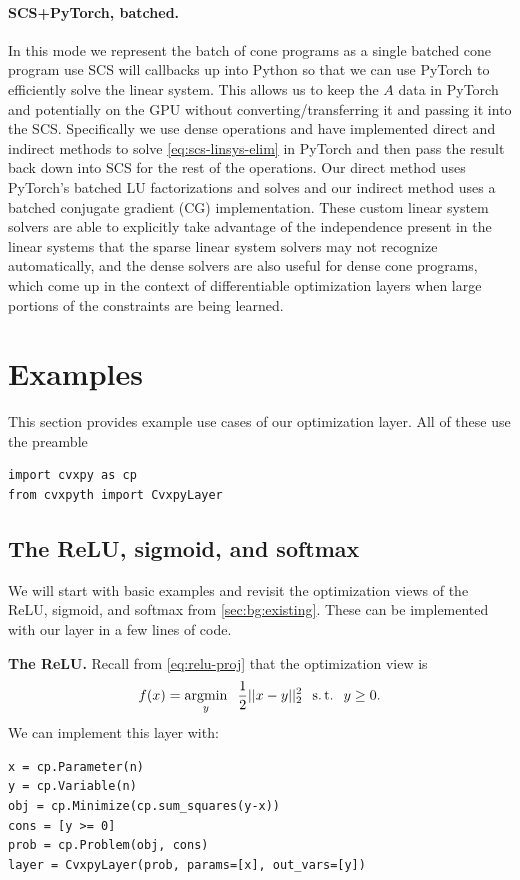 \paragraph{SCS+PyTorch, batched.}
In this mode we represent the batch of cone programs as a single
batched cone program use SCS will callbacks up into Python so
that we can use PyTorch to efficiently solve the linear system.
This allows us to keep the $A$ data in PyTorch and potentially
on the GPU without converting/transferring it and passing it
into the SCS.
Specifically we use dense operations and have implemented
direct and indirect methods to solve \cref{eq:scs-linsys-elim}
in PyTorch and then pass the result back down into SCS for the
rest of the operations.
Our direct method uses PyTorch's batched LU factorizations and
solves and our indirect method uses a batched conjugate
gradient (CG) implementation.
These custom linear system solvers are able to explicitly take
advantage of the independence present in the linear systems
that the sparse linear system solvers may not recognize automatically,
and the dense solvers are also useful for dense cone programs,
which come up in the context of differentiable optimization
layers when large portions of the constraints are being learned.

\newpage
\section{Examples}
\label{sec:cvxpyth:examples}

This section provides example use cases of our \cvxpy
optimization layer. All of these use the preamble

\begin{lstlisting}
import cvxpy as cp
from cvxpyth import CvxpyLayer
\end{lstlisting}

\subsection{The ReLU, sigmoid, and softmax}
We will start with basic examples and revisit the optimization
views of the ReLU, sigmoid, and softmax from \cref{sec:bg:existing}.
These can be implemented with our \cvxpy layer
in a few lines of code.

\textbf{The ReLU.}
Recall from \cref{eq:relu-proj} that the optimization view is
\begin{equation*}
  f(x) = \operatorname*{argmin}_y \;\; \frac{1}{2}||x-y||_2^2 \;\; \operatorname*{s.t.} \;\; y\geq 0.
\end{equation*}
We can implement this layer with:
\begin{lstlisting}
x = cp.Parameter(n)
y = cp.Variable(n)
obj = cp.Minimize(cp.sum_squares(y-x))
cons = [y >= 0]
prob = cp.Problem(obj, cons)
layer = CvxpyLayer(prob, params=[x], out_vars=[y])
\end{lstlisting}

